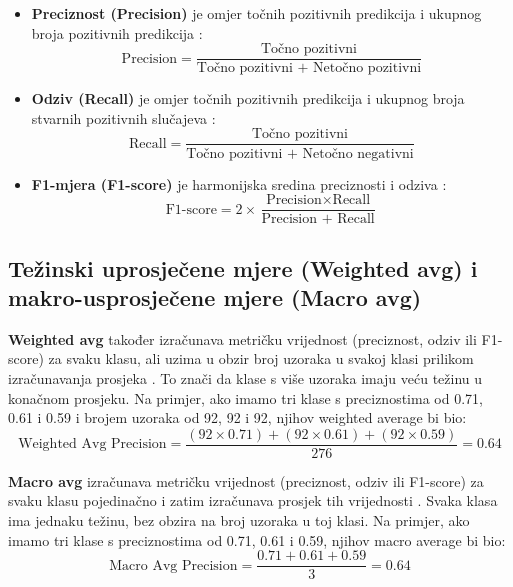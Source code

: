 \documentclass[zavrsnirad]{fer}
\begin{document}
\begin{itemize}
	\item \textbf{Preciznost (Precision)} je omjer točnih pozitivnih predikcija i ukupnog broja pozitivnih predikcija \cite{medium_confusion_matrix}:
	\begin{equation}
		\text{Precision} = \frac{\text{Točno pozitivni}}{\text{Točno pozitivni + Netočno pozitivni}}
	\end{equation}
	\item \textbf{Odziv (Recall)} je omjer točnih pozitivnih predikcija i ukupnog broja stvarnih pozitivnih slučajeva \cite{medium_confusion_matrix}:
	\begin{equation}
		\text{Recall} = \frac{\text{Točno pozitivni}}{\text{Točno pozitivni + Netočno negativni}}
	\end{equation}
	\item \textbf{F1-mjera (F1-score)} je harmonijska sredina preciznosti i odziva \cite{towardsdatascience_confusion_matrix}:
	\begin{equation}
		\text{F1-score} = 2 \times \frac{\text{Precision} \times \text{Recall}}{\text{Precision + Recall}}
	\end{equation}
\end{itemize}


\subsection{Težinski uprosječene mjere (Weighted avg) i makro-usprosječene mjere (Macro avg)}

\textbf{Weighted avg} također izračunava metričku vrijednost (preciznost, odziv ili F1-score) za svaku klasu, ali uzima u obzir broj uzoraka u svakoj klasi prilikom izračunavanja prosjeka \cite{Mathew2023}. To znači da klase s više uzoraka imaju veću težinu u konačnom prosjeku. Na primjer, ako imamo tri klase s preciznostima od 0.71, 0.61 i 0.59 i brojem uzoraka od 92, 92 i 92, njihov weighted average bi bio:
\[ \text{Weighted Avg Precision} = \frac{(92 \times 0.71) + (92 \times 0.61) + (92 \times 0.59)}{276} = 0.64 \]

\textbf{Macro avg} izračunava metričku vrijednost (preciznost, odziv ili F1-score) za svaku klasu pojedinačno i zatim izračunava prosjek tih vrijednosti \cite{Mathew2023}. Svaka klasa ima jednaku težinu, bez obzira na broj uzoraka u toj klasi. Na primjer, ako imamo tri klase s preciznostima od 0.71, 0.61 i 0.59, njihov macro average bi bio:
\[ \text{Macro Avg Precision} = \frac{0.71 + 0.61 + 0.59}{3} = 0.64 \]
\end{document}
